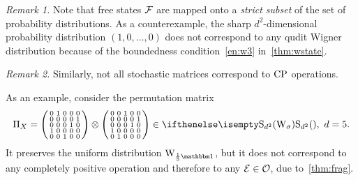 \emph{Remark 1.} Note that free states $\mathcal{F}$ are mapped onto a \emph{strict subset} of the set of probability distributions.
As a counterexample, the sharp $d^2$-dimensional probability distribution $(1, 0, \dots, 0)$ does not correspond to any qudit Wigner distribution because of the boundedness condition~\ref{en:w3} in~\cref{thm:wstate}.

\emph{Remark 2.} Similarly, not all stochastic matrices correspond to ${\rm{CP}}$ operations.

As an example, consider the permutation matrix
\begin{equation}
    \Pi_X = \begin{psmallmatrix}
        0 & 1 & 0 & 0 & 0 \\
        0 & 0 & 0 & 0 & 1 \\
        0 & 0 & 0 & 1 & 0 \\
        1 & 0 & 0 & 0 & 0 \\
        0 & 0 & 1 & 0 & 0
    \end{psmallmatrix} \otimes \begin{psmallmatrix}
        0 & 0 & 1 & 0 & 0 \\
        0 & 0 & 0 & 0 & 1 \\
        0 & 0 & 0 & 1 & 0 \\
        1 & 0 & 0 & 0 & 0 \\
        0 & 1 & 0 & 0 & 0    
    \end{psmallmatrix} \in \stochw,\ d=5.
\end{equation}
It preserves the uniform distribution $\W{\frac{1}{5}\id}{}$, but it does not correspond to any completely positive operation and therefore to any $\mathcal{E} \in \mathcal{O}$, due to~\cref{thm:frag}.